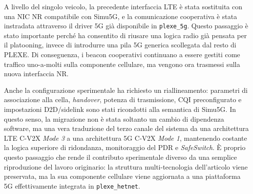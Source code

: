 A livello del singolo veicolo, la precedente interfaccia LTE è stata sostituita con una NIC NR compatibile con Simu5G, e la comunicazione cooperativa è stata instradata attraverso il driver 5G già disponibile in \texttt{plexe\_5g}. Questo passaggio è stato importante perché ha consentito di riusare una logica radio già pensata per il platooning, invece di introdurre una pila 5G generica scollegata dal resto di PLEXE. Di conseguenza, i beacon cooperativi continuano a essere gestiti come traffico uno-a-molti sulla componente cellulare, ma vengono ora trasmessi sulla nuova interfaccia NR.

Anche la configurazione sperimentale ha richiesto un riallineamento: parametri di associazione alla cella, \emph{handover}, potenza di trasmissione, CQI preconfigurato e impostazioni D2D/sidelink sono stati ricondotti alla semantica di Simu5G. In questo senso, la migrazione non è stata soltanto un cambio di dipendenza software, ma una vera traduzione del terzo canale del sistema da una architettura LTE C-V2X \emph{Mode 3} a una architettura 5G C-V2X \emph{Mode 1}, mantenendo costante la logica superiore di ridondanza, monitoraggio del PDR e \emph{SafeSwitch}. È proprio questo passaggio che rende il contributo sperimentale diverso da una semplice riproduzione del lavoro originario: la struttura multi-tecnologia dell'articolo viene preservata, ma la sua componente cellulare viene aggiornata a una piattaforma 5G effettivamente integrata in \texttt{plexe\_hetnet}.
